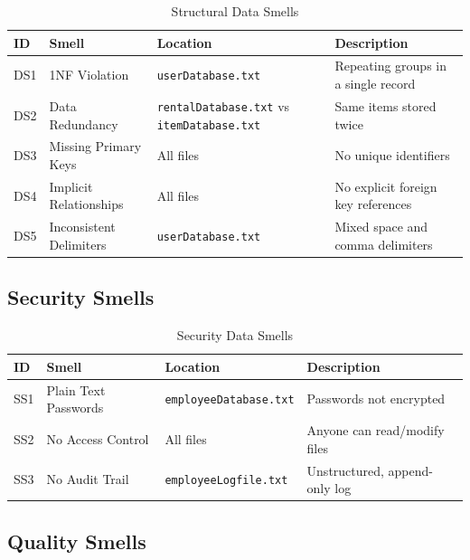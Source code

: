 \begin{table}[h]
  \centering
  \caption{Structural Data Smells}
  \begin{tabular}{p{1.2cm} p{4cm} p{3.5cm} p{4cm}}
    \toprule
    \textbf{ID} & \textbf{Smell} & \textbf{Location} & \textbf{Description} \\
    \midrule
    DS1 & 1NF Violation           & \texttt{userDatabase.txt} & Repeating groups in a single record \\
    DS2 & Data Redundancy         & \texttt{rentalDatabase.txt} vs \texttt{itemDatabase.txt} & Same items stored twice \\
    DS3 & Missing Primary Keys    & All files                  & No unique identifiers \\
    DS4 & Implicit Relationships  & All files                  & No explicit foreign key references \\
    DS5 & Inconsistent Delimiters & \texttt{userDatabase.txt}  & Mixed space and comma delimiters \\
    \bottomrule
  \end{tabular}
\end{table}

\subsection{Security Smells}

\begin{table}[h]
  \centering
  \caption{Security Data Smells}
  \begin{tabular}{p{1.2cm} p{4cm} p{3.5cm} p{4cm}}
    \toprule
    \textbf{ID} & \textbf{Smell} & \textbf{Location} & \textbf{Description} \\
    \midrule
    SS1 & Plain Text Passwords & \texttt{employeeDatabase.txt} & Passwords not encrypted \\
    SS2 & No Access Control    & All files                    & Anyone can read/modify files \\
    SS3 & No Audit Trail       & \texttt{employeeLogfile.txt} & Unstructured, append-only log \\
    \bottomrule
  \end{tabular}
\end{table}

\subsection{Quality Smells}

